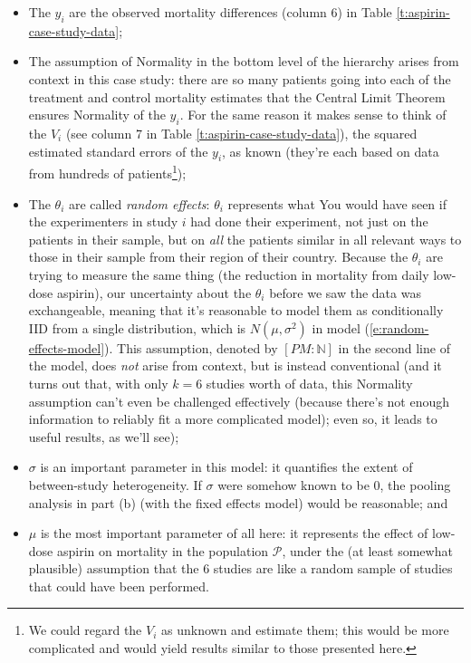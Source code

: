 \documentclass[12pt]{article}
\begin{document}
\begin{itemize}

\item

The $y_i$ are the observed mortality differences (column 6) in Table \ref{t:aspirin-case-study-data}; 

\item

The assumption of Normality in the bottom level of the hierarchy arises from context in this case study: there are so many patients going into each of the treatment and control mortality estimates that the Central Limit Theorem ensures Normality of the $y_i$. For the same reason it makes sense to think of the $V_i$ (see column 7 in Table \ref{t:aspirin-case-study-data}), the squared estimated standard errors of the $y_i$, as known (they're each based on data from hundreds of patients\footnote{We could regard the $V_i$ as unknown and estimate them; this would be more complicated and would yield results similar to those presented here.});

\item

The $\theta_i$ are called \textit{random effects}: $\theta_i$ represents what You would have seen if the experimenters in study $i$ had done their experiment, not just on the patients in their sample, but on \textit{all} the patients similar in all relevant ways to those in their sample from their region of their country. Because the $\theta_i$ are trying to measure the same thing (the reduction in mortality from daily low-dose aspirin), our uncertainty about the $\theta_i$ before we saw the data was exchangeable, meaning that it's reasonable to model them as conditionally IID from a single distribution, which is $N ( \mu, \sigma^2 )$ in model (\ref{e:random-effects-model}). This assumption, denoted by $[ PM \! \! : \mathbb{ N } ]$ in the second line of the model, does \textit{not} arise from context, but is instead conventional (and it turns out that, with only $k = 6$ studies worth of data, this Normality assumption can't even be challenged effectively (because there's not enough information to reliably fit a more complicated model); even so, it leads to useful results, as we'll see);

\item

$\sigma$ is an important parameter in this model: it quantifies the extent of between-study heterogeneity. If $\sigma$ were somehow known to be 0, the pooling analysis in part (b) (with the fixed effects model) would be reasonable; and

\item

$\mu$ is the most important parameter of all here: it represents the effect of low-dose aspirin on mortality in the population $\mathcal{ P }$, under the (at least somewhat plausible) assumption that the 6 studies are like a random sample of studies that could have been performed.

\end{itemize}
\end{document}
